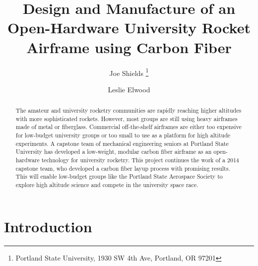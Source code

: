 \documentclass{aiaa-tc}%
\title{Design and Manufacture of an Open-Hardware 
 	University Rocket Airframe using Carbon Fiber}
\author{
	Joe Shields \thanks{Portland State University, 1930 SW 4th Ave, Portland, OR 97201} 
	\and Leslie Elwood\thanksibid{1}%
 }
\begin{document}
\maketitle

\begin{abstract}
The amateur and university rocketry communities are rapidly reaching higher altitudes with more sophisticated rockets. However, most groups are still using heavy airframes made of metal or fiberglass. Commercial off-the-shelf airframes are either too expensive for low-budget university groups or too small to use as a platform for high altitude experiments. 
A capstone team of mechanical engineering seniors at Portland State University has developed a low-weight, modular carbon fiber airframe as an open-hardware technology for university rocketry. 
This project continues the work of a 2014 capstone team, who developed a carbon fiber layup process with promising results. 
This will enable low-budget groups like the Portland State Aerospace Society to explore high altitude science and compete in the university space race.  \end{abstract}

\printnomenclature


\section{Introduction}
\end{document}

